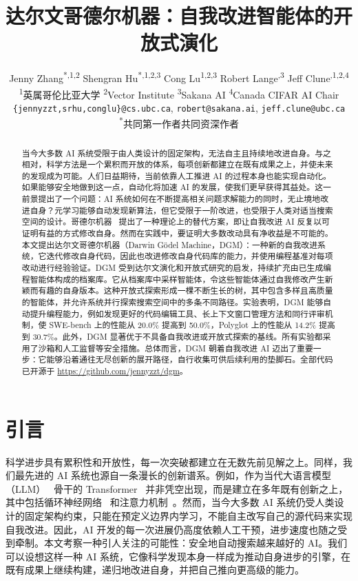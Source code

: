\documentclass[10pt,twocolumn]{article}
\title{达尔文哥德尔机器：自我改进智能体的开放式演化}
\author{Jenny Zhang\textsuperscript{*,1,2}\quad
Shengran Hu\textsuperscript{*,1,2,3}\quad
Cong Lu\textsuperscript{1,2,3}\quad
Robert Lange\textsuperscript{\dag,3}\quad
Jeff Clune\textsuperscript{\dag,1,2,4}\\[0.5em]
\small \textsuperscript{1}英属哥伦比亚大学\quad
\textsuperscript{2}Vector Institute\quad
\textsuperscript{3}Sakana AI\quad
\textsuperscript{4}Canada CIFAR AI Chair\\
\footnotesize \texttt{\{jennyzzt,srhu,conglu\}@cs.ubc.ca},
\texttt{robert@sakana.ai}, \texttt{jeff.clune@ubc.ca}\\[-0.2em]
\footnotesize \textsuperscript{*}共同第一作者\quad \textsuperscript{\dag}共同资深作者}
\date{}
\begin{document}
\maketitle

\begin{abstract}
当今大多数 AI 系统受限于由人类设计的固定架构，无法自主且持续地改进自身。与之相对，科学方法是一个累积而开放的体系，每项创新都建立在既有成果之上，并使未来的发现成为可能。人们日益期待，当前依靠人工推进 AI 的过程本身也能实现自动化。如果能够安全地做到这一点，自动化将加速 AI 的发展，使我们更早获得其益处。这一前景提出了一个问题：AI 系统如何在不断提高相关问题求解能力的同时，无止境地改进自身？元学习能够自动发现新算法，但它受限于一阶改进，也受限于人类对适当搜索空间的设计。哥德尔机器~\citep{schmidhuber2007godel} 提出了一种理论上的替代方案，即让自我改进 AI 反复以可证明有益的方式修改自身。然而在实践中，要证明大多数改动具有净收益是不可能的。本文提出达尔文哥德尔机器（Darwin G\"odel Machine，DGM）：一种新的自我改进系统，它迭代修改自身代码，因此也改进修改自身代码库的能力，并使用编程基准对每项改动进行经验验证。DGM 受到达尔文演化和开放式研究的启发，持续扩充由已生成编程智能体构成的档案库。它从档案库中采样智能体，令这些智能体通过自我修改产生新颖而有趣的自身版本。这种开放式探索形成一棵不断生长的树，其中包含多样且高质量的智能体，并允许系统并行探索搜索空间中的多条不同路径。实验表明，DGM 能够自动提升编程能力，例如发现更好的代码编辑工具、长上下文窗口管理方法和同行评审机制，使 SWE-bench 上的性能从 20.0\% 提高到 50.0\%，Polyglot 上的性能从 14.2\% 提高到 30.7\%。此外，DGM 显著优于不具备自我改进或开放式探索的基线。所有实验都采用了沙箱和人工监督等安全措施。总体而言，DGM 朝着自我改进 AI 迈出了重要一步：它能够沿着通往无尽创新的展开路径，自行收集可供后续利用的垫脚石。全部代码已开源于 \href{https://github.com/jennyzzt/dgm}{https://github.com/jennyzzt/dgm}。
\end{abstract}

\section{引言}
\label{sec:intro}

科学进步具有累积性和开放性，每一次突破都建立在无数先前见解之上。同样，我们最先进的 AI 系统也源自一条漫长的创新谱系。例如，作为当代大语言模型（LLM）~\citep{brown2020language} 骨干的 Transformer~\citep{vaswani2017attention} 并非凭空出现，而是建立在多年既有创新之上，其中包括循环神经网络~\citep{linnainmaa1970representation,amari1972learning,hopfield1982neural,rumelhart1985learning} 和注意力机制~\citep{schmidhuber1990learning,bahdanau2015neural,kim2017structured,parikh2016decomposable}。然而，当今大多数 AI 系统仍受人类设计的固定架构约束，只能在预定义边界内学习，不能自主改写自己的源代码来实现自我改进。因此，AI 开发的每一次进展仍高度依赖人工干预，进步速度也随之受到牵制。本文考察一种引人关注的可能性：安全地自动搜索越来越好的 AI。我们可以设想这样一种 AI 系统，它像科学发现本身一样成为推动自身进步的引擎，在既有成果上继续构建，递归地改进自身，并把自己推向更高级的能力。
\end{document}
